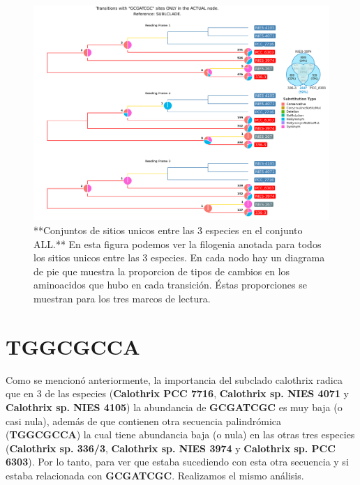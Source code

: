 \documentclass[
]{book}
\begin{document}
\begin{figure}

{\centering \includegraphics[width=1.2\linewidth]{Clados/Calothrix_B/figures/A/GCGATCGC/Actual/SUBCLADE_Actual_A_tree} 

}

\caption{**Conjuntos de sitios unicos entre las 3 especies en el conjunto ALL.** En esta figura podemos ver la filogenia anotada para todos los sitios unicos entre las 3 especies. En cada nodo hay un diagrama de pie que muestra la proporcion de tipos de cambios en los aminoacidos que hubo en cada transición. Éstas proporciones se muestran para los tres marcos de lectura.}\label{fig:FIG16}
\end{figure}

\hypertarget{tggcgcca}{%
\section{TGGCGCCA}\label{tggcgcca}}

Como se mencionó anteriormente, la importancia del subclado calothrix radica que en 3 de las especies (\textbf{Calothrix PCC 7716}, \textbf{Calothrix sp. NIES 4071} y \textbf{Calothrix sp. NIES 4105}) la abundancia de \textbf{GCGATCGC} es muy baja (o casi nula), además de que contienen otra secuencia palindrómica (\textbf{TGGCGCCA}) la cual tiene abundancia baja (o nula) en las otras tres especies (\textbf{Calothrix sp. 336/3}, \textbf{Calothrix sp. NIES 3974} y \textbf{Calothrix sp. PCC 6303}). Por lo tanto, para ver que estaba sucediendo con esta otra secuencia y si estaba relacionada con \textbf{GCGATCGC}. Realizamos el mismo análisis.

  
\end{document}
